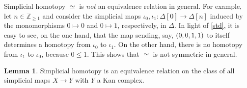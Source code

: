 \documentclass[10pt,letterpaper,cm]{nupset}
\theoremstyle{definition}
\theoremstyle{theorem}
\newtheorem{lemma}[definition]{Lemma}
\theoremstyle{remark}
\newcommand{\Z}{\mathbb Z}
\newcommand{\0}{\mathbf{0}}
\newcommand{\1}{\mathbf{1}}
\newcommand{\2}{\mathbf{2}}
\begin{document}
\medskip

Simplicial homotopy ${}\simeq{}$ is \emph{not} an equivalence relation in general. For example, let $n\in \Z_{\geq 1}$ and consider the simplicial maps $\iota_0, \iota_1 : \Delta[0] \to \Delta[n]$ induced by the monomorphisms $0 \mapsto 0$ and $0 \mapsto 1$, respectively, in $\varDelta$. In light of \cref{std}, it is easy to see, on the one hand, that the map sending, say, $\mleft(0, 0, 1, 1\mright)$ to itself determines a homotopy from $\iota_0$ to $\iota_1$. On the other hand, there is no homotopy from $\iota_1$ to $\iota_0$, because $0\leq 1$. This shows that ${}\simeq{}$ is not symmetric in general. 

\begin{lemma}
Simplicial homotopy is an equivalence relation on the class of all simplicial maps $X\to Y$ with $Y$ a Kan complex.
\end{lemma}
\end{document}
